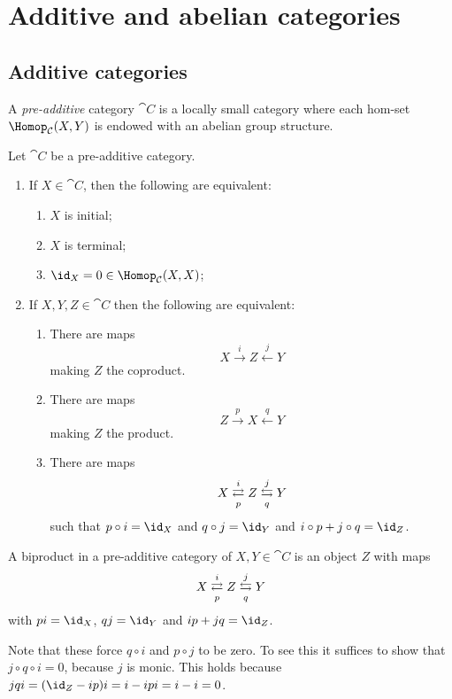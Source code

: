 \documentclass[../main.tex]{subfiles}
\begin{document}
\chapter{Additive and abelian categories}
\section{Additive categories}
\begin{defn}
	A \emph{pre-additive} category $\cat C$ is a locally small category where each hom-set $\Hom_{\cat C}(X, Y)$ is endowed with an abelian group structure.
\end{defn}
\begin{lem}\label{lem:pre-additive-categories-are-nice}
Let $\cat C$ be a pre-additive category.
\begin{enumerate}
	\item If $X \in \cat C$, then the following are equivalent:
	\begin{enumerate}
    	\item $X$ is initial;
        \item $X$ is terminal;
        \item $\id_X = 0 \in \Hom_{\cat C}(X,X)$;
    \end{enumerate}
	\item If $X, Y, Z \in \cat C$ then the following are equivalent:
	\begin{enumerate}
    	\item There are maps \[X \xrightarrow{i} Z \xleftarrow{j} Y\] making $Z$ the coproduct.
    	\item There are maps \[Z \xrightarrow{p} X \xleftarrow{q} Y\] making $Z$ the product.
		\item There are maps \[X \xrightleftarrows{i}[p] Z \xleftrightarrows{j}[q] Y\] such that $p \circ i = \id_X$ and $q \circ j = \id_Y$ and $i\circ p + j \circ q = \id_Z$.
    \end{enumerate}

\end{enumerate}

\end{lem}

\begin{defn}
	A biproduct in a pre-additive category of $X, Y \in \cat C$ is an object $Z$ with maps \[X \xrightleftarrows{i}[p] Z \xleftrightarrows{j}[q] Y\] with $pi = \id_X$, $qj = \id_Y$ and $ip + jq = \id_Z$.
\end{defn}
\begin{rmk}
	Note that these force $q \circ i$ and $p \circ j$ to be zero. To see this it suffices to show that $j \circ q \circ i = 0$, because $j$ is monic.
	This holds because $jqi = (\id_Z - ip)i = i - ipi = i - i = 0$.
\end{rmk}
\end{document}
